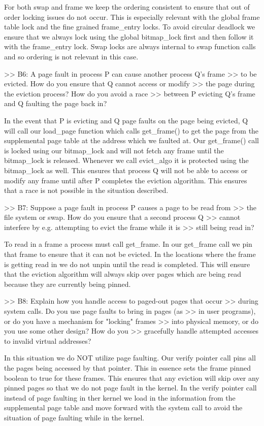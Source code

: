 For both swap and frame we keep the ordering consistent
to ensure that out of order locking issues do not occur. This
is especially relevant with the global frame table lock and the
fine grained frame_entry locks. To avoid circular deadlock we ensure
that we always lock using the global bitmap_lock first and then
follow it with the frame_entry lock. Swap locks are always internal to
swap function calls and so ordering is not relevant in this case. 

>> B6: A page fault in process P can cause another process Q's frame
>> to be evicted.  How do you ensure that Q cannot access or modify
>> the page during the eviction process?  How do you avoid a race
>> between P evicting Q's frame and Q faulting the page back in?

In the event that P is evicting and Q page faults on the page being evicted,
Q will call our load_page function which calls get_frame() to get the page
from the supplemental page table at the address which we faulted at. 
Our get_frame() call is locked using our bitmap_lock and will not fetch 
any frame until the bitmap_lock is released. Whenever we call evict_algo 
it is protected using the bitmap_lock as well. This ensures that process 
Q will not be able to access or modify any frame until after P completes 
the eviction algorithm. This ensures that a race is not possible
in the situation described.

>> B7: Suppose a page fault in process P causes a page to be read from
>> the file system or swap.  How do you ensure that a second process Q
>> cannot interfere by e.g. attempting to evict the frame while it is
>> still being read in?

To read in a frame a process must call get_frame. In our get_frame call
we pin that frame to ensure that it can not be evicted. In the locations
where the frame is getting read in we do not unpin until the read is
completed. This will ensure that the eviction algorithm will always
skip over pages which are being read because they are currently being
pinned. 

>> B8: Explain how you handle access to paged-out pages that occur
>> during system calls.  Do you use page faults to bring in pages (as
>> in user programs), or do you have a mechanism for "locking" frames
>> into physical memory, or do you use some other design?  How do you
>> gracefully handle attempted accesses to invalid virtual addresses?

In this situation we do NOT utilize page faulting. Our verify pointer call
pins all the pages being accessed by that pointer. This in essence sets the
frame pinned boolean to true for these frames. This ensures that any eviction
will skip over any pinned pages so that we do not page fault in the kernel.
In the verify pointer call instead of page faulting in ther kernel we load 
in the information from the supplemental page table and move forward with 
the system call to avoid the situation of page faulting while in the
kernel. 

